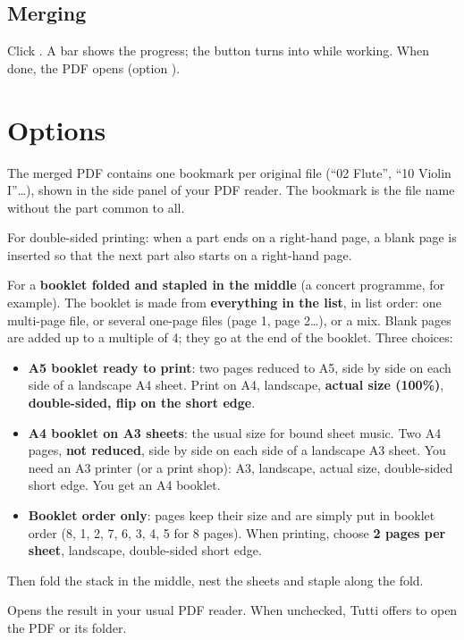 \subsection{Merging}
Click . A bar shows the progress; the button turns into  while working.
When done, the PDF opens (option ).


\section{Options}\label{sec:options}

\begin{description}[style=nextline,leftmargin=5mm,font=\sffamily\bfseries\color{bordeaux}]
\item[One bookmark per file]
The merged PDF contains one bookmark per original file (“02 Flute”, “10 Violin I”…), shown in the
side panel of your PDF reader. The bookmark is the file name without the part common to all.
\item[Start each part on a right-hand page]
For double-sided printing: when a part ends on a right-hand page, a blank page is inserted so that
the next part also starts on a right-hand page.
\item[Layout: booklet]
For a \textbf{booklet folded and stapled in the middle} (a concert programme, for example). The
booklet is made from \textbf{everything in the list}, in list order: one multi-page file, or several
one-page files (page 1, page 2…), or a mix. Blank pages are added up to a multiple of 4; they go at the
end of the booklet. Three choices:
\begin{itemize}
\item \textbf{A5 booklet ready to print}: two pages reduced to A5, side by side on each side of a
      landscape A4 sheet. Print on A4, landscape, \textbf{actual size (100\%)},
      \textbf{double-sided, flip on the short edge}.
\item \textbf{A4 booklet on A3 sheets}: the usual size for bound sheet music. Two A4 pages,
      \textbf{not reduced}, side by side on each side of a landscape A3 sheet. You need an A3
      printer (or a print shop): A3, landscape, actual size, double-sided short edge. You get an
      A4 booklet.
\item \textbf{Booklet order only}: pages keep their size and are simply put in booklet order
      (8, 1, 2, 7, 6, 3, 4, 5 for 8 pages). When printing, choose \textbf{2 pages per sheet},
      landscape, double-sided short edge.
\end{itemize}
Then fold the stack in the middle, nest the sheets and staple along the fold.
\item[Open the PDF when done]
Opens the result in your usual PDF reader. When unchecked, Tutti offers to open the PDF or its folder.
\end{description}

